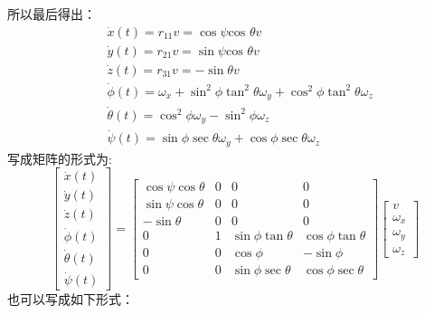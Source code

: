 所以最后得出\cite{ref23}：
\begin{equation}
    \begin{aligned}
&\dot{x}(t) =r_{11}v=\cos\psi\text{cos }\theta v \\
&\dot{y}(t) =r_{21}v=\sin \psi\text{cos }\theta v \\
&\dot{z}(t) =r_{31}v=-\sin \theta v \\
&\dot{\phi}(t) =\omega_x+\sin^2\phi\tan^2\theta\omega_y+\cos^2\phi\tan^2\theta\omega_z \\
&\dot{\theta}(t) =\cos^2\phi\omega_y-\sin^2\phi\omega_z \\
&\dot{\psi}(t) =\sin \phi\sec \theta\omega_y+\cos \phi\sec \theta\omega_z 
\end{aligned}
\end{equation}
写成矩阵的形式为:
\begin{equation}
    \begin{bmatrix}\dot{x}(t)\\\dot{y}(t)\\\dot{z}(t)\\\dot{\phi}(t)\\\dot{\theta}(t)\\\dot{\psi}(t)\end{bmatrix}=\begin{bmatrix}\cos\psi\cos\theta&0&0&0\\\sin\psi\cos\theta&0&0&0\\-\sin\theta&0&0&0\\0&1&\sin\phi\tan\theta&\cos\phi\tan\theta\\0&0&\cos\phi&-\sin\phi\\0&0&\sin\phi\sec\theta&\cos\phi\sec\theta\end{bmatrix}\begin{bmatrix}v\\\omega_x\\\omega_y\\\omega_z\end{bmatrix}
\end{equation}
也可以写成如下形式：
